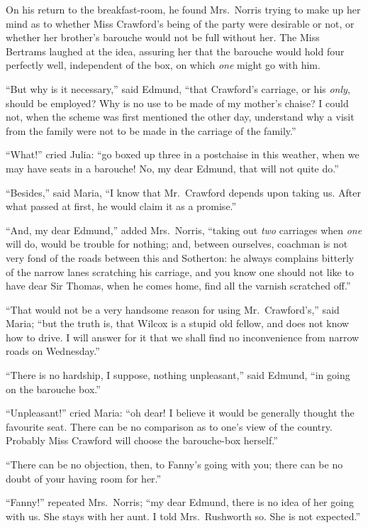 On his return to the breakfast-room, he found Mrs.\ Norris
trying to make up her mind as to whether Miss Crawford's
being of the party were desirable or not, or whether
her brother's barouche would not be full without her.
The Miss Bertrams laughed at the idea, assuring her
that the barouche would hold four perfectly well,
independent of the box, on which \emph{one} might go with him.

``But why is it necessary,'' said Edmund, ``that Crawford's carriage,
or his \emph{only}, should be employed?  Why is no use to be
made of my mother's chaise?  I could not, when the scheme
was first mentioned the other day, understand why a visit
from the family were not to be made in the carriage of the family.''

``What!'' cried Julia:  ``go boxed up three in a postchaise
in this weather, when we may have seats in a barouche!
No, my dear Edmund, that will not quite do.''

``Besides,'' said Maria, ``I know that Mr.\ Crawford depends
upon taking us.  After what passed at first, he would
claim it as a promise.''

``And, my dear Edmund,'' added Mrs.\ Norris, ``taking out \emph{two}
carriages when \emph{one} will do, would be trouble for nothing;
and, between ourselves, coachman is not very fond of the
roads between this and Sotherton:  he always complains
bitterly of the narrow lanes scratching his carriage,
and you know one should not like to have dear Sir Thomas,
when he comes home, find all the varnish scratched off.''

``That would not be a very handsome reason for using
Mr.\ Crawford's,'' said Maria; ``but the truth is, that Wilcox
is a stupid old fellow, and does not know how to drive.
I will answer for it that we shall find no inconvenience
from narrow roads on Wednesday.''

``There is no hardship, I suppose, nothing unpleasant,''
said Edmund, ``in going on the barouche box.''

``Unpleasant!'' cried Maria:  ``oh dear!  I believe it would
be generally thought the favourite seat.  There can
be no comparison as to one's view of the country.
Probably Miss Crawford will choose the barouche-box herself.''

``There can be no objection, then, to Fanny's going with you;
there can be no doubt of your having room for her.''

``Fanny!'' repeated Mrs.\ Norris; ``my dear Edmund, there is
no idea of her going with us.  She stays with her aunt.
I told Mrs.\ Rushworth so.  She is not expected.''

